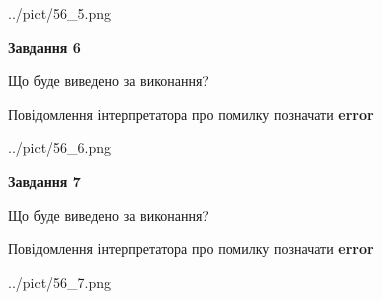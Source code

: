 \documentclass[10pt, ukrainian]{article}
\begin{document}
{\begin {large}
\begin{center}
	{../pict/56_5.png}
\end{center}
\newpage

{\begin {center}\textbf{Завдання 6}\end {center}}\par
Що буде виведено за виконання? \par
Повідомлення інтерпретатора про помилку позначати \textbf{error}

\begin{center}
	{../pict/56_6.png}
\end{center}
\newpage

{\begin {center}\textbf{Завдання 7}\end {center}}\par
Що буде виведено за виконання? \par
Повідомлення інтерпретатора про помилку позначати \textbf{error}

\begin{center}
	{../pict/56_7.png}
\end{center}
\newpage

\end {large}}
\end{document}
